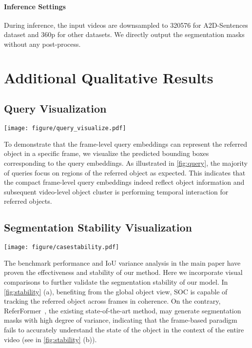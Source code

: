 \documentclass{article}
\begin{document}
\vspace{-5pt}
\paragraph{Inference Settings}
During inference, the input videos are downsampled to 320576 for A2D-Sentences dataset and 360p for other datasets. We directly output the segmentation masks without any post-process.

\section{Additional Qualitative Results}

\subsection{Query Visualization}
\begin{figure*}
    \centering
    \texttt{[image: figure/query\_visualize.pdf]}
    \vspace{-15pt}
    \caption{Visualization of the frame-level object query}
    \label{fig:query}
    \vspace{-10pt}
\end{figure*}

To demonstrate that the frame-level query embeddings can represent the referred object in a specific frame, we visualize the predicted bounding boxes corresponding to the query embeddings.
As illustrated in \cref{fig:query}, the majority of queries focus on regions of the referred object as expected. This indicates that the compact frame-level query embeddings indeed reflect object information and  subsequent video-level object cluster is performing temporal interaction for referred objects.

\subsection{Segmentation Stability Visualization}\label{app:stability}
\begin{figure*}
    \centering
    \texttt{[image: figure/casestability.pdf]}
    \vspace{-15pt}
    \caption{Visualization comparisons of segmentation stability between our SOC and existing state-of-the-art method ReferFormer~\cite{referformer}. (a) and (b) denote our SOC and ReferFormer, respectively.}
    \label{fig:stability}
    \vspace{-10pt}
\end{figure*}
The benchmark performance and IoU variance analysis in the main paper have proven the effectiveness and stability of our method.
Here we incorporate visual comparisons to further validate the segmentation stability of our model. In \cref{fig:stability} (a), benefiting from the global object view, SOC is capable of tracking the referred object across frames in coherence. On the contrary, ReferFormer~\cite{referformer}, the existing state-of-the-art method, may generate segmentation masks with high degree of variance, indicating that the frame-based paradigm fails to accurately understand the state of the object in the context of the entire video (see in \cref{fig:stability} (b)).     
\end{document}
